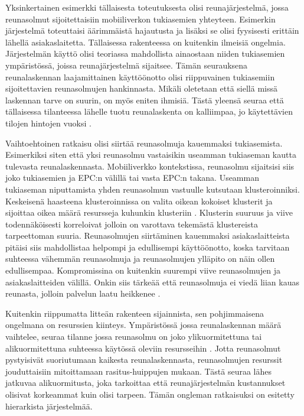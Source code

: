 Yksinkertainen esimerkki tällaisesta toteutuksesta olisi reunajärjestelmä, jossa reunasolmut sijoitettaisiin mobiiliverkon tukiasemien yhteyteen. Esimerkin järjestelmä  toteuttaisi äärimmäistä hajautusta ja lisäksi se olisi fyysisesti erittäin lähellä asiakaslaitetta. Tällaisessa rakenteessa on kuitenkin ilmeisiä ongelmia. Järjestelmän käyttö olisi teoriassa mahdollista ainaostaan niiden tukiasemien ympäristössä, joissa reunajärjestelmä sijaitsee. Tämän seurauksena reunalaskennan laajamittainen käyttöönotto olisi riippuvainen tukiasemiin sijoitettavien reunasolmujen hankinnasta. Mikäli oletetaan että siellä missä laskennan tarve on suurin, on myös eniten ihmisiä. Tästä yleensä seuraa että tällaisessa tilanteessa lähelle tuotu reunalaskenta on kalliimpaa, jo käytettävien tilojen hintojen vuoksi \cite{mao17}.

Vaihtoehtoinen ratkaisu olisi siirtää reunasolmuja kauemmaksi tukiasemista. Esimerkiksi siten että yksi reunasolmu vastaisikin useamman tukiaseman kautta tulevasta reunalaskennasta. Mobiiliverkko kontekstissa, reunasolmu sijaitsisi siis joko tukiasemien ja EPC:n välillä tai vasta EPC:n takana.  
Useamman tukiaseman niputtamista yhden reunasolmun vastuulle kutsutaan klusteroinniksi. 
Keskeisenä haasteena klusteroinnissa on valita oikean kokoiset klusterit ja sijoittaa oikea määrä resursseja kuhunkin klusteriin \cite{malandrino2016close}.
Klusterin suuruus ja viive todennäköisesti korreloivat jolloin on varottava tekemästä klustereista tarpeettoman suuria.
Reunasolmujen siirtäminen kauemmaksi asiakaslaitteista pitäisi siis mahdollistaa helpompi ja edullisempi käyttöönotto, koska tarvitaan suhteessa vähemmän reunasolmuja ja reunasolmujen ylläpito on näin ollen edullisempaa.
Kompromissina on kuitenkin suurempi viive reunasolmujen ja asiakaslaitteiden välillä. 
Onkin siis tärkeää että reunasolmuja ei viedä liian kauas reunasta, jolloin palvelun laatu heikkenee \cite{mao17}. 


Kuitenkin riippumatta litteän rakenteen sijainnista, sen pohjimmaisena ongelmana on resurssien kiinteys. Ympäristössä jossa reunalaskennan määrä vaihtelee, seuraa tilanne jossa reunasolmu on joko ylikuormitettuna tai alikuormitettuna suhteessa käytössä oleviin resursseihin \cite{tong2016hierarchical}. Jotta reunasolmut pystyisivät suoriutumaan kaikesta reunalaskennasta, reunasolmujen resurssit jouduttaisiin mitoittamaan rasitus-huippujen mukaan. Tästä seuraa lähes jatkuvaa alikuormitusta, joka tarkoittaa että reunajärjestelmän kustannukset olisivat korkeammat kuin olisi tarpeen. 
Tämän ongleman ratkaisuksi on esitetty hierarkista järjestelmää.


